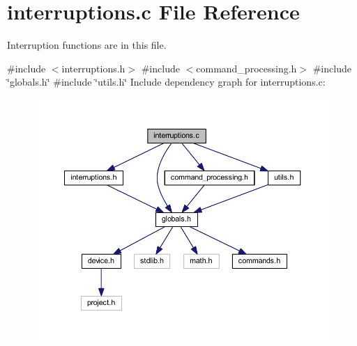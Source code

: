 \section{interruptions.\+c File Reference}
\label{interruptions_8c}


Interruption functions are in this file.  


{\ttfamily \#include $<$interruptions.\+h$>$}\newline
{\ttfamily \#include $<$command\+\_\+processing.\+h$>$}\newline
{\ttfamily \#include \char`\"{}globals.\+h\char`\"{}}\newline
{\ttfamily \#include \char`\"{}utils.\+h\char`\"{}}\newline
Include dependency graph for interruptions.\+c\+:
\nopagebreak
\begin{figure}[H]
\begin{center}
\leavevmode
\includegraphics[width=350pt]{interruptions_8c__incl}
\end{center}
\end{figure}
